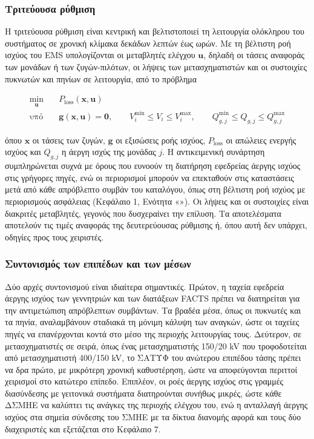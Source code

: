 \subsubsection{Τριτεύουσα ρύθμιση}

Η τριτεύουσα ρύθμιση είναι κεντρική και βελτιστοποιεί τη λειτουργία ολόκληρου του συστήματος σε
χρονική κλίμακα δεκάδων λεπτών έως ωρών. Με τη βέλτιστη ροή ισχύος του EMS υπολογίζονται οι
μεταβλητές ελέγχου $\mathbf{u}$, δηλαδή οι τάσεις αναφοράς των μονάδων ή των ζυγών-πιλότων, οι
λήψεις των μετασχηματιστών και οι συστοιχίες πυκνωτών και πηνίων σε λειτουργία, από το πρόβλημα

\begin{equation}
\begin{aligned}
\min_{\mathbf{u}} \quad & P_{\mathrm{loss}}(\mathbf{x}, \mathbf{u}) \\
\text{υπό} \quad & \mathbf{g}(\mathbf{x}, \mathbf{u}) = \mathbf{0}, \qquad
V_i^{\min} \le V_i \le V_i^{\max}, \qquad
Q_{g,j}^{\min} \le Q_{g,j} \le Q_{g,j}^{\max}
\end{aligned}
\label{eq:orpf}
\end{equation}

όπου $\mathbf{x}$ οι τάσεις των ζυγών, $\mathbf{g}$ οι εξισώσεις ροής ισχύος, $P_{\mathrm{loss}}$
οι απώλειες ενεργής ισχύος και $Q_{g,j}$ η άεργη ισχύς της μονάδας $j$. Η αντικειμενική
συνάρτηση συμπληρώνεται συχνά με όρους που ευνοούν τη διατήρηση εφεδρείας άεργης ισχύος στις
γρήγορες πηγές, ενώ οι περιορισμοί μπορούν να επεκταθούν στις καταστάσεις μετά από κάθε
απρόβλεπτο συμβάν του καταλόγου, όπως στη βέλτιστη ροή ισχύος με περιορισμούς ασφάλειας
(Κεφάλαιο 1, Ενότητα «»). Οι λήψεις και οι συστοιχίες είναι διακριτές
μεταβλητές, γεγονός που δυσχεραίνει την επίλυση. Τα αποτελέσματα αποτελούν τις τιμές αναφοράς
της δευτερεύουσας ρύθμισης ή, όπου αυτή δεν υπάρχει, οδηγίες προς τους χειριστές.

\subsubsection{Συντονισμός των επιπέδων και των μέσων}

Δύο αρχές συντονισμού είναι ιδιαίτερα σημαντικές. Πρώτον, η ταχεία εφεδρεία άεργης ισχύος των
γεννητριών και των διατάξεων FACTS πρέπει να διατηρείται για την αντιμετώπιση απρόβλεπτων
συμβάντων. Τα βραδέα μέσα, όπως οι πυκνωτές και τα πηνία, αναλαμβάνουν σταδιακά τη μόνιμη
κάλυψη των αναγκών, ώστε οι ταχείες πηγές να επανέρχονται κοντά στο μέσο της περιοχής
λειτουργίας τους. Δεύτερον, σε μετασχηματιστές σε σειρά, όπως ένας μετασχηματιστής 150/20 kV
που τροφοδοτείται από μετασχηματιστή 400/150 kV, το ΣΑΤΥΦ του ανώτερου επιπέδου τάσης πρέπει
να δρα πρώτο, με μικρότερη χρονική καθυστέρηση, ώστε να αποφεύγονται περιττοί χειρισμοί στο
κατώτερο επίπεδο. Επιπλέον, οι ροές άεργης ισχύος στις γραμμές διασύνδεσης με γειτονικά
συστήματα διατηρούνται συνήθως μικρές, ώστε κάθε ΔΣΜΗΕ να καλύπτει τις ανάγκες της περιοχής
ελέγχου του, ενώ η ανταλλαγή άεργης ισχύος στα σημεία σύνδεσης του ΣΜΗΕ με τα
δίκτυα διανομής αφορά και τους δύο διαχειριστές και εξετάζεται στο Κεφάλαιο 7.

